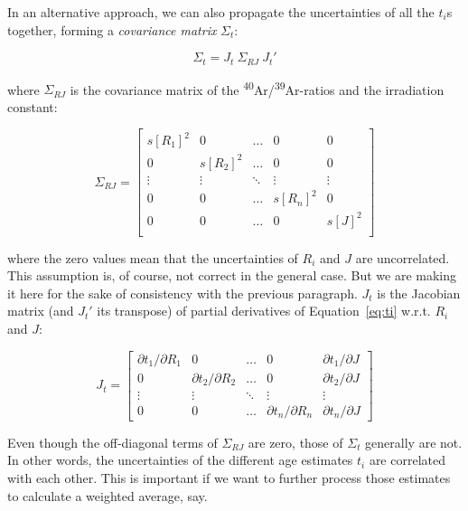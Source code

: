 \documentclass{article}
\begin{document}
In an alternative approach, we can also propagate the uncertainties of
all the $t_i$s together, forming a \emph{covariance matrix}
$\Sigma_t$:

\begin{equation}
  \Sigma_t = J_t ~ \Sigma_{RJ} ~ J_t'
  \label{eq:Sigmat}
\end{equation}

\noindent where $\Sigma_{RJ}$ is the covariance matrix of the
\textsuperscript{40}Ar/\textsuperscript{39}Ar-ratios and the
irradiation constant:

\begin{equation}
  \Sigma_{RJ} = \left[
    \begin{array}{ccccc}
      s[R_1]^2 & 0 & \ldots & 0 & 0 \\
      0 & s[R_2]^2 & \ldots & 0 & 0 \\
      \vdots & \vdots & \ddots & \vdots & \vdots \\
      0 & 0 & \ldots & s[R_n]^2 & 0 \\
      0 & 0 & \ldots & 0 & s[J]^2 \\
    \end{array}
    \right]
  \label{eq:SigmaRJ}
\end{equation}

\noindent where the zero values mean that the uncertainties of $R_i$
and $J$ are uncorrelated. This assumption is, of course, not correct
in the general case.  But we are making it here for the sake of
consistency with the previous paragraph. $J_t$ is the Jacobian matrix
(and $J_t'$ its transpose) of partial derivatives of
Equation~\ref{eq:ti} w.r.t. $R_i$ and $J$:

\begin{equation}
  J_t = \left[ \begin{array}{ccccc}
      {\partial t_1}/{\partial R_1} & 0 & \ldots & 0 &
      {\partial t_1}/{\partial J}\\
      0 & \partial t_2/\partial R_2 & \ldots &
      0 & {\partial t_2}/{\partial J} \\
      \vdots & \vdots & \ddots & \vdots & \vdots \\
      0 & 0 & \ldots &
      {\partial t_n}/{\partial R_n} & {\partial t_n}/{\partial J}
    \end{array}\right]
\end{equation}

Even though the off-diagonal terms of $\Sigma_{RJ}$ are zero, those of
$\Sigma_t$ generally are not. In other words, the uncertainties of the
different age estimates $t_i$ are correlated with each other.  This is
important if we want to further process those estimates to calculate a
weighted average, say.
\end{document}
